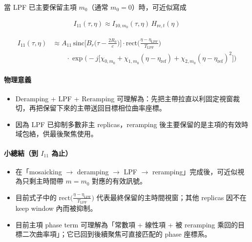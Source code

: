 \documentclass[11pt]{article}
\providecommand{\tightlist}{%
  \setlength{\itemsep}{0pt}\setlength{\parskip}{0pt}}
\begin{document}
當 LPF 已主要保留主項 \(m_0\)（通常 \(m_0=0\)）時，可近似寫成

\begin{equation}
\begin{aligned}
I_{11}(\tau,\eta)\approx I_{10,m_0}(\tau,\eta)\,H_{\mathrm{re},t}(\eta)
\end{aligned}
\end{equation}

\begin{equation}
\begin{aligned}
I_{11}(\tau,\eta)
&\approx
A_{11}\,
\mathrm{sinc}\biggl[ B_r\biggl( \tau-\frac{2R_0}{c} \biggr) \biggr]
\cdot \mathrm{rect}\biggl( \frac{\eta-\eta_{\mathrm{LPF}}}{T_{\mathrm{LPF}}} \biggr)\\
&\qquad \cdot
\exp\biggl( -j\biggl[ \chi_{0,m_0}+\chi_{1,m_0}(\eta-\eta_{\mathrm{ref}})+\chi_{2,m_0}(\eta-\eta_{\mathrm{ref}})^2 \biggr] \biggr)
\end{aligned}
\end{equation}

\hypertarget{ux7269ux7406ux610fux7fa9-1}{%
\paragraph{物理意義}\label{ux7269ux7406ux610fux7fa9-1}}

\begin{itemize}
\tightlist
\item
  Deramping + LPF + Reramping
  可理解為：先把主帶拉直以利固定視窗裁切，再把保留下來的主帶送回目標相位曲率座標。
\item
  因為 LPF 已抑制多數非主 replicas，reramping
  後主要保留的是主項的有效時域包絡，供最後聚焦使用。
\end{itemize}

\hypertarget{ux5c0fux7e3dux7d50ux5230-i_11-ux70baux6b62}{%
\paragraph{\texorpdfstring{小總結（到 \(I_{11}\)
為止）}{小總結（到 I\_\{11\} 為止）}}\label{ux5c0fux7e3dux7d50ux5230-i_11-ux70baux6b62}}

\begin{itemize}
\tightlist
\item
  在「mosaicking \(\rightarrow\) deramping \(\rightarrow\) LPF
  \(\rightarrow\) reramping」完成後，可近似視為只剩主時間帶 \(m=m_0\)
  對應的有效訊號。
\item
  目前式子中的
  \(\mathrm{rect}\biggl( \frac{\eta-\eta_{\mathrm{LPF}}}{T_{\mathrm{LPF}}} \biggr)\)
  代表最終保留的主時間視窗；其他 replicas 因不在 keep window
  內而被抑制。
\item
  目前主項 phase term 可理解為「常數項 + 線性項 + 被 reramping
  乘回的目標二次曲率項」；它已回到後續聚焦可直接匹配的 phase 座標系。
\end{itemize}
\end{document}
